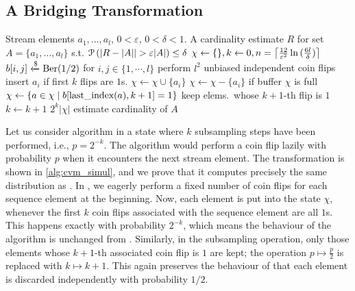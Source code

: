 \subsection{A Bridging Transformation}
\begin{algorithm}[t]
	\caption{Modified CVM algorithm with independent coin flips. The function last{\textunderscore}index returns the index of the last occurrence of an element in the sequence, before the current iteration.}\label{alg:cvm_simul}
	\begin{algorithmic}[1]
  \Require Stream elements $a_1,\dots,a_l$, $0 < \varepsilon$, $0 < \delta < 1$.
  \Ensure A cardinality estimate $R$ for set $A = \{ a_1,\dots,a_l \}$ s.t. $\prob \left( |R - |A| | > \varepsilon |A| \right) \leq \delta$
  \State $\chi \gets \{\}, k \gets 0, n = \ceil*{\frac{12}{\varepsilon^2} \ln{(\frac{6l}{\delta})} }$
  \State $b[i,j] \getsr \Ber(1/2)$ for $i,j \in \{1,\cdots,l\}$ \Comment perform $l^2$ unbiased independent coin flips
     \Comment insert $a_i$ if first $k$ flips are $1$s.
      \State $\chi \gets \chi \cup \{a_i\}$
    \Else
      \State $\chi \gets \chi - \{a_i\}$
    \EndIf
     \Comment if buffer $\chi$ is full
      \State $\chi \gets \{a \in \chi \;|\; b[\textrm{last{\textunderscore}index}(a),k+1] = 1\}$ \Comment keep elems.~whose $k+1$-th flip is $1$
      \State $k \gets k+1$
    \EndIf
  \EndFor
  \State \Return $2^k |\chi|$ \Comment estimate cardinality of $A$
  \end{algorithmic}
\end{algorithm}

Let us consider algorithm  in a state where $k$ subsampling steps have been performed, i.e., $p = 2^{-k}$.
The algorithm would perform a coin flip lazily with probability $p$ when it encounters the next stream element.
The transformation  is shown in \cref{alg:cvm_simul}, and we prove that it computes precisely the same distribution as .
In , we eagerly perform a fixed number of coin flips for each sequence element at the beginning.
Now, each element is put into the state $\chi$, whenever the first $k$ coin flips associated with the sequence element are all $1$s.
This happens exactly with probability $2^{-k}$, which means the behaviour of the algorithm is unchanged from .
Similarly, in the subsampling operation, only those elements whose $k+1$-th associated coin flip is $1$ are kept; the operation $p \mapsto \frac{p}{2}$ is replaced with $k \mapsto k+1$.
This again preserves the behaviour of  that each element is discarded independently with probability $1/2$.

